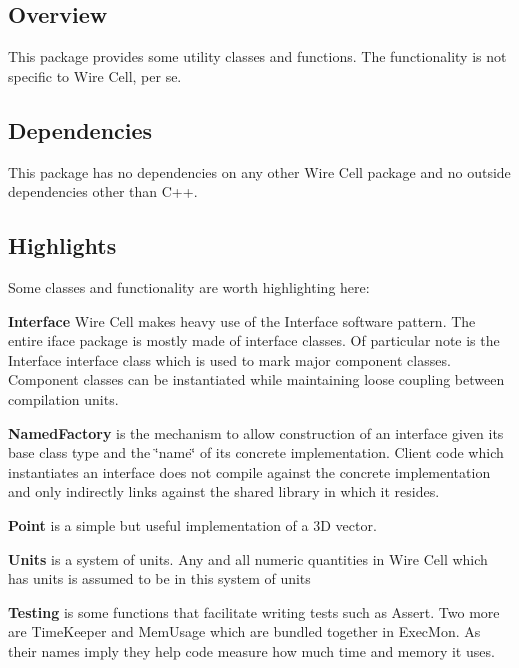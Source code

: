 \subsection*{Overview }

This package provides some utility classes and functions. The functionality is not specific to Wire Cell, per se.

\subsection*{Dependencies }

This package has no dependencies on any other Wire Cell package and no outside dependencies other than C++.

\subsection*{Highlights }

Some classes and functionality are worth highlighting here\+:


\begin{DoxyItemize}
\item {\bfseries Interface} Wire Cell makes heavy use of the Interface software pattern. The entire {\ttfamily iface} package is mostly made of interface classes. Of particular note is the {\ttfamily Interface} interface class which is used to mark major component classes. Component classes can be instantiated while maintaining loose coupling between compilation units.
\item {\bfseries Named\+Factory} is the mechanism to allow construction of an interface given its base class type and the \char`\"{}name\char`\"{} of its concrete implementation. Client code which instantiates an interface does not compile against the concrete implementation and only indirectly links against the shared library in which it resides.
\item {\bfseries Point} is a simple but useful implementation of a 3D vector.
\item {\bfseries Units} is a system of units. Any and all numeric quantities in Wire Cell which has units is assumed to be in this system of units
\item {\bfseries Testing} is some functions that facilitate writing tests such as {\ttfamily Assert}. Two more are {\ttfamily Time\+Keeper} and {\ttfamily Mem\+Usage} which are bundled together in {\ttfamily Exec\+Mon}. As their names imply they help code measure how much time and memory it uses. 
\end{DoxyItemize}